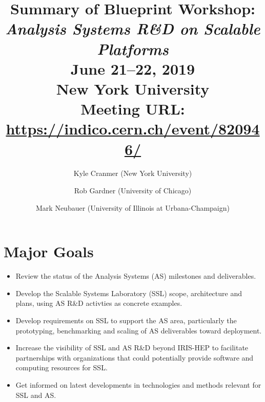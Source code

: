 \documentclass[11pt,letterpaper,fleqn]{article}
\date{} %
\title{\large Summary of Blueprint Workshop: \\
\vspace{1pt}
\color{red}
\LARGE \textit{Analysis Systems R\&D on Scalable Platforms} \\
\color{black} \normalsize
\vspace{10pt}
June 21--22, 2019 \\
New York University \\
Meeting URL: \href{https://indico.cern.ch/event/820946/}{https://indico.cern.ch/event/820946/}
} %
\author{Kyle Cranmer {\normalfont(New York University)}
      \and  Rob Gardner {\normalfont(University of Chicago)}
      \and  Mark Neubauer {\normalfont(University of Illinois at Urbana-Champaign)}
      }
\begin{document}
\maketitle %
\normalfont

\thispagestyle{firststyle}

\vspace{-45pt}

\section*{Major Goals}
\vspace{3pt}
\begin{itemize}
  \item Review the status of the Analysis Systems (AS) milestones and deliverables.
  \item Develop the Scalable Systems Laboratory (SSL) scope, architecture and plans, using AS R\&D activties as concrete examples.
  \item Develop requirements on SSL to support the AS area, particularly the prototyping, benchmarking and scaling of AS deliverables toward deployment.
  \item Increase the visibility of SSL and AS R\&D beyond IRIS-HEP to facilitate partnerships with organizations that could potentially provide software and computing resources for SSL.
  \item Get informed on latest developments in technologies and methods relevant for SSL and AS.
\end{itemize}
\end{document}

